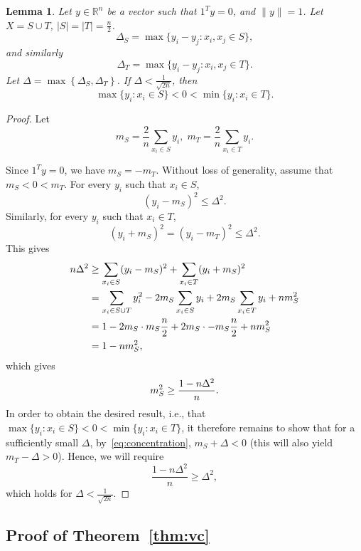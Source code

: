 \documentclass{article} %
\newtheorem{lemma}[theorem]{Lemma}
\begin{document}

\begin{lemma}\label{lem:sep}
Let $y \in \mathbb{R}^n$ be a vector such that $1^Ty=0$, and $\|y\|=1$.
Let $X=S\cup T$, $|S| = |T|=\frac{n}{2}$.
$$\Delta_S = \max\{y_i-y_j: x_i,x_j\in S\},$$
and similarly
$$\Delta_T = \max\{y_i-y_j: x_i,x_j\in T\}.$$
Let $\Delta = \max\left\{\Delta_S,\Delta_T\right\}$.
If $\Delta < \frac{1}{\sqrt{2n}}$, then
$$ \max\{y_i: x_i \in S\} < 0 < \min\{y_i:x_i\in T\}.$$
\end{lemma}

\begin{proof}
Let
$$m_S = \frac{2}{n}\sum_{x_i\in S}y_i,\;
m_T = \frac{2}{n}\sum_{x_i\in T}y_i.$$

Since $1^Ty=0$, we have $m_S=-m_T$.
Without loss of generality, assume that $m_S < 0 < m_T$.
For every $y_i$ such that $x_i \in S$,
\begin{equation}  \label{eq:concentration}
(y_i-m_S)^2 \le \Delta^2.
\end{equation}
Similarly, for every $y_i$ such that $x_i \in T$,
$$(y_i+m_S)^2 = (y_i-m_T)^2 \le \Delta^2.$$
This gives
\begin{align}
n\Delta^2 &\ge \sum_{x_i \in S}(y_i-m_S)^2 + \sum_{x_i \in T}(y_i+m_S)^2 \notag\\
&= \sum_{x_i\in S \cup T}y_i^2 -2m_S\sum_{x_i\in S}y_i + 2m_S\sum_{x_i\in T}y_i +nm_S^2\notag\\
&= 1 -2m_S\cdot m_S\frac{n}{2} + 2m_S\cdot -m_S\frac{n}{2} +nm_S^2\notag\\
&=1 - nm_S^2, \notag
\end{align}
which gives
\begin{equation}
m_S^2 \ge \frac{1-n\Delta^2}{n}.\notag
\end{equation}
In order to obtain the desired result, i.e., that $ \max\{y_i: x_i \in S\} < 0 < \min\{y_i:x_i\in T\}$, it therefore remains to show that for a sufficiently small $\Delta$, by~\eqref{eq:concentration}, $m_S + \Delta < 0$ (this will also yield $m_T - \Delta > 0$).
Hence, we will require
$$\frac{1-n\Delta^2}{n} \ge \Delta^2, $$
which holds for $\Delta < \frac{1}{\sqrt{2n}}$.
\end{proof}


\subsection{Proof of Theorem~\ref{thm:vc}}
\end{document}
